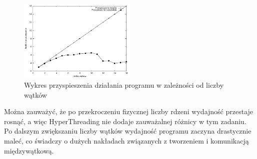 \documentclass[a4paper,12pt]{article}
\begin{document}
\begin{figure}[!ht]
	\centering
  \includegraphics[width=0.5\textwidth]{wykresPrzyspieszenie.pdf}
  \caption{Wykres przyspieszenia działania programu w zależności od liczby wątków}
\end{figure}
Można zauważyć, że po przekroczeniu fizycznej liczby rdzeni wydajność przestaje rosnąć, a więc HyperThreading nie dodaje zauważalnej różnicy w tym zadaniu. Po dalszym zwiększaniu liczby wątków wydajność programu zaczyna drastycznie maleć, co świadczy o dużych nakładach związanych z tworzeniem i komunikacją międzywątkową.
\end{document}
